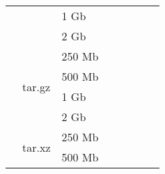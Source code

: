 \documentclass{article}           %
\begin{document}
\begin{table}[]
\begin{tabular}{llllllll}
\multicolumn{1}{|l|}{}                               & \multicolumn{1}{l|}{}                         & \multicolumn{1}{l|}{1 Gb}   & \multicolumn{1}{l|}{}       & \multicolumn{1}{l|}{}       & \multicolumn{1}{l|}{}           & \multicolumn{1}{l|}{}      & \multicolumn{1}{l|}{}        \\ \cline{3-8} 
\multicolumn{1}{|l|}{}                               & \multicolumn{1}{l|}{}                         & \multicolumn{1}{l|}{2 Gb}   & \multicolumn{1}{l|}{}       & \multicolumn{1}{l|}{}       & \multicolumn{1}{l|}{}           & \multicolumn{1}{l|}{}      & \multicolumn{1}{l|}{}        \\ \cline{2-8} 
\multicolumn{1}{|l|}{}                               & \multicolumn{1}{l|}{\multirow{4}{*}{tar.gz}}  & \multicolumn{1}{l|}{250 Mb} & \multicolumn{1}{l|}{}       & \multicolumn{1}{l|}{}       & \multicolumn{1}{l|}{}           & \multicolumn{1}{l|}{}      & \multicolumn{1}{l|}{}        \\ \cline{3-8} 
\multicolumn{1}{|l|}{}                               & \multicolumn{1}{l|}{}                         & \multicolumn{1}{l|}{500 Mb} & \multicolumn{1}{l|}{}       & \multicolumn{1}{l|}{}       & \multicolumn{1}{l|}{}           & \multicolumn{1}{l|}{}      & \multicolumn{1}{l|}{}        \\ \cline{3-8} 
\multicolumn{1}{|l|}{}                               & \multicolumn{1}{l|}{}                         & \multicolumn{1}{l|}{1 Gb}   & \multicolumn{1}{l|}{}       & \multicolumn{1}{l|}{}       & \multicolumn{1}{l|}{}           & \multicolumn{1}{l|}{}      & \multicolumn{1}{l|}{}        \\ \cline{3-8} 
\multicolumn{1}{|l|}{}                               & \multicolumn{1}{l|}{}                         & \multicolumn{1}{l|}{2 Gb}   & \multicolumn{1}{l|}{}       & \multicolumn{1}{l|}{}       & \multicolumn{1}{l|}{}           & \multicolumn{1}{l|}{}      & \multicolumn{1}{l|}{}        \\ \cline{2-8} 
\multicolumn{1}{|l|}{}                               & \multicolumn{1}{l|}{\multirow{4}{*}{tar.xz}}  & \multicolumn{1}{l|}{250 Mb} & \multicolumn{1}{l|}{}       & \multicolumn{1}{l|}{}       & \multicolumn{1}{l|}{}           & \multicolumn{1}{l|}{}      & \multicolumn{1}{l|}{}        \\ \cline{3-8} 
\multicolumn{1}{|l|}{}                               & \multicolumn{1}{l|}{}                         & \multicolumn{1}{l|}{500 Mb} & \multicolumn{1}{l|}{}       & \multicolumn{1}{l|}{}       & \multicolumn{1}{l|}{}           & \multicolumn{1}{l|}{}      & \multicolumn{1}{l|}{}        \\ \cline{3-8} 

\end{tabular}
\end{table}
\end{document}
